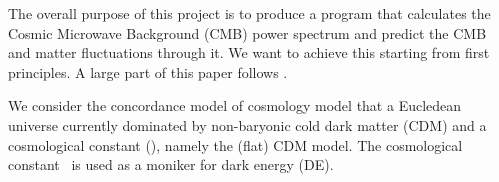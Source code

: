 





The overall purpose of this project is to produce a program that calculates the Cosmic Microwave Background (CMB) power spectrum and predict the CMB and matter fluctuations through it. We want to achieve this starting from first principles. A large part of this paper follows \citep{Callin2006}.

We consider the concordance model of cosmology model that a Eucledean universe currently dominated by non-baryonic cold dark matter (CDM) and a cosmological constant (\textLambda), namely the (flat) \textLambda CDM model. The cosmological constant \textLambda\, is used as a moniker for dark energy (DE). \citep{DodelsonBook}